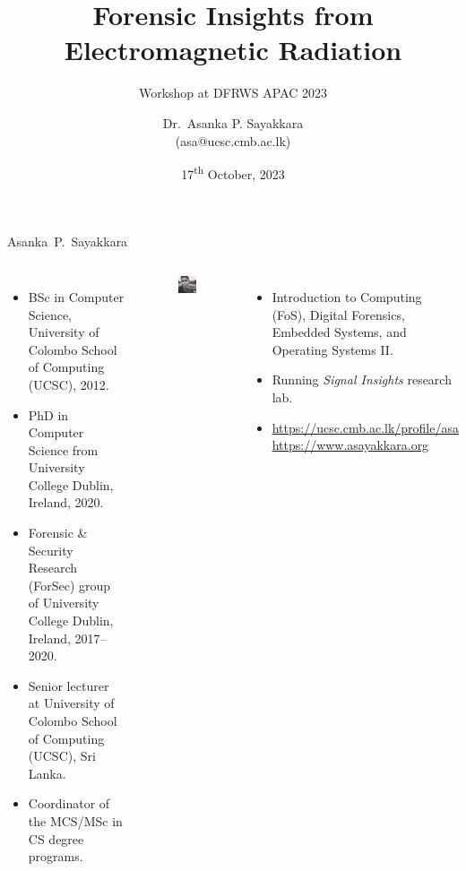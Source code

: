 \documentclass[handout]{beamer}
\title[DFRWS APAC 2023]{Forensic Insights from Electromagnetic Radiation}
\subtitle{\footnotesize Workshop at DFRWS APAC 2023}
\author[Asanka P. Sayakkara]{
	Dr.~Asanka P. Sayakkara \\ {\scriptsize{(asa@ucsc.cmb.ac.lk)}}
}
\institute[UCSC]{\scriptsize Suntec Convention \& Exhibition Centre,\\Singapore.}
\date{\tiny 17\textsuperscript{th} October, 2023}
\begin{document}
\begin{frame}
\titlepage
\end{frame}

\begin{frame}{Asanka~P.~Sayakkara}  

	\begin{columns}
	
	
	\begin{itemize}
	\footnotesize
	\item BSc in Computer Science, University of Colombo School of Computing (UCSC), 2012.
	\vspace{10pt}
	\item PhD in Computer Science from University College Dublin, Ireland, 2020.
	\vspace{10pt}
	\item Forensic \& Security Research (ForSec) group of University College Dublin, Ireland,  2017--2020.
	\vspace{10pt}
	\item Senior lecturer at University of Colombo School of Computing (UCSC), Sri Lanka.
	\vspace{10pt}
	\item Coordinator of the MCS/MSc in CS degree programs.

	\end{itemize}



	\begin{figure}
		\includegraphics[width=80pt]{figures/me-with-mote.jpg}
	\end{figure}

	\begin{itemize}
	\footnotesize
	\item Introduction to Computing (FoS), Digital Forensics, Embedded Systems, and Operating Systems II.
	\vspace{10pt}
	\item Running \emph{Signal Insights} research lab.
	\vspace{10pt}
	\item {\scriptsize \url{https://ucsc.cmb.ac.lk/profile/asa} \\ \url{https://www.asayakkara.org}}
	\end{itemize}

	\end{columns}
\end{frame}
\end{document}

